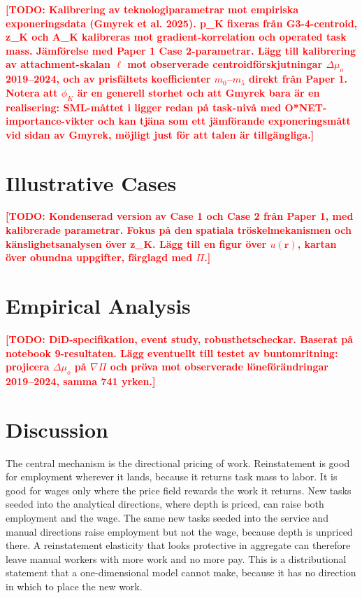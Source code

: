 \documentclass[12pt, a4paper]{article}
\newcommand{\todo}[1]{\textcolor{red}{\textbf{[TODO: #1]}}}
\begin{document}
\todo{Kalibrering av teknologiparametrar mot empiriska
exponeringsdata (Gmyrek et al. 2025). p\_K fixeras från G3-4-centroid,
z\_K och A\_K kalibreras mot gradient-korrelation och operated task
mass. Jämförelse med Paper 1 Case 2-parametrar. Lägg till kalibrering
av attachment-skalan $\ell$ mot observerade centroidförskjutningar
$\Delta\mu_o$ 2019--2024, och av prisfältets koefficienter $m_0$--$m_5$
direkt från Paper 1. Notera att $\phi_K$ är en generell storhet och att
Gmyrek bara är en realisering: SML-måttet i
\textcite{brynjolfsson2018mlworkforce} ligger redan på task-nivå med
O*NET-importance-vikter och kan tjäna som ett jämförande exponeringsmått
vid sidan av Gmyrek, möjligt just för att talen är tillgängliga.}

\section{Illustrative Cases}
\label{sec:cases}

\todo{Kondenserad version av Case 1 och Case 2 från Paper 1,
med kalibrerade parametrar. Fokus på den spatiala tröskelmekanismen
och känslighetsanalysen över z\_K. Lägg till en figur över $u(\mathbf{r})$,
kartan över obundna uppgifter, färglagd med $\Pi$.}

\section{Empirical Analysis}
\label{sec:empirics}

\todo{DiD-specifikation, event study, robusthetscheckar.
Baserat på notebook 9-resultaten. Lägg eventuellt till testet av
buntomritning: projicera $\Delta\mu_o$ på $\nabla\Pi$ och pröva mot
observerade löneförändringar 2019--2024, samma 741 yrken.}

\section{Discussion}
\label{sec:discuss}

The central mechanism is the directional pricing of work. Reinstatement
is good for employment wherever it lands, because it returns task mass
to labor. It is good for wages only where the price field rewards the
work it returns. New tasks seeded into the analytical directions, where
depth is priced, can raise both employment and the wage. The same new
tasks seeded into the service and manual directions raise employment
but not the wage, because depth is unpriced there. A reinstatement
elasticity that looks protective in aggregate can therefore leave
manual workers with more work and no more pay. This is a distributional
statement that a one-dimensional model cannot make, because it has no
direction in which to place the new work.
\end{document}
